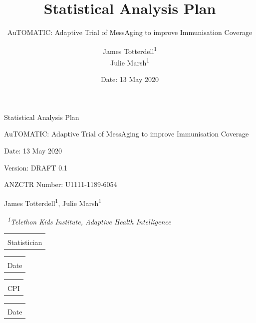 \documentclass[
  bibliography=totoc]{scrreprt}
\title{Statistical Analysis Plan}
\subtitle{AuTOMATIC: Adaptive Trial of MessAging to improve Immunisation Coverage}
\author{James Totterdell\textsuperscript{1} \\ Julie Marsh\textsuperscript{1}}
\affil{\textsuperscript{1}Telethon Kids Institute, Adaptive Health Intelligence}
\date{Date: 13 May 2020}
\makeatletter
\newcommand{\titledate}[2][2.5in]{%
  \noindent%
  \begin{tabular}{@{}p{#1}@{}}
    \\ \hline \\[-.75\normalbaselineskip]
    #2
  \end{tabular} \hspace{1in}
  \begin{tabular}{@{}p{#1}@{}}
    \\ \hline \\[-.75\normalbaselineskip]
    Date
  \end{tabular}\vspace{4\baselineskip}
}
\makeatother
\begin{document}

\begin{titlepage}


  \begin{center}
    {\sectfont\Huge Statistical Analysis Plan\par}\vspace{3\baselineskip}
    {\huge AuTOMATIC: Adaptive Trial of MessAging to improve Immunisation Coverage\par}\vspace{3\baselineskip}
  \end{center}
  {\large Date: 13 May 2020\par}\vspace{0.5\baselineskip}
  {\large Version: DRAFT 0.1\par}\vspace{0.5\baselineskip}
  {\large ANZCTR Number: U1111-1189-6054\par}\vspace{0.5\baselineskip}
  {\large           James Totterdell\textsuperscript{1},
          Julie Marsh\textsuperscript{1}  \par}\vspace{0.5\baselineskip}
  {\large\          \textit{\textsuperscript{1}Telethon Kids Institute, Adaptive Health Intelligence}  \par}\vspace{10\baselineskip}

  \titledate{Statistician}
  \titledate{CPI}\vfill

\end{titlepage}

\end{document}
